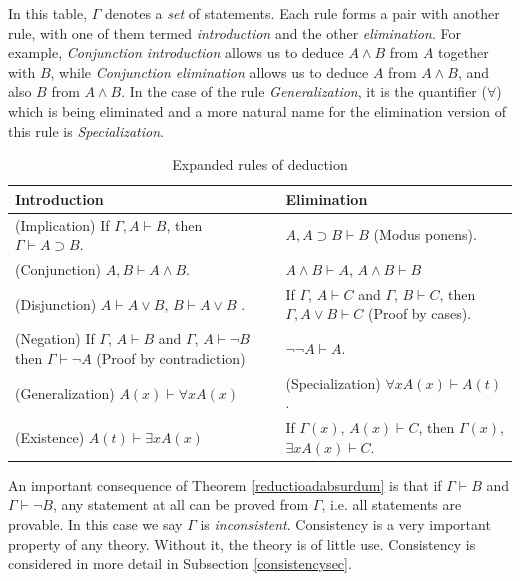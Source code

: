 In this table, $\Gamma$ denotes a {\em set} of statements. Each rule forms a pair with
another rule, with one of them termed {\em introduction} and the other {\em elimination}.
For example, {\em Conjunction introduction} allows us to deduce $A\wedge B$ from $A$ together with $B$,
while {\em Conjunction elimination} allows us to deduce $A$ from $A\wedge B$, and also $B$ from $A\wedge B$.
In the case of the rule {\em Generalization}, it is the quantifier ($\forall$) which is being eliminated
and a more natural name for the elimination version of this rule is {\em Specialization}.
\begin{table}
		\centering
		\caption{Expanded rules of deduction}\label{Kleenerules}
		\begin{tabular}{|p{5cm}|p{5cm}|}
				\hline
		\bf Introduction & \bf Elimination\\
				\hline
		(Implication) If $\Gamma, A \vdash B$, then $\Gamma \vdash A\supset B$. &
		$A, A\supset B \vdash B$ (Modus ponens).\\
				\hline
		(Conjunction) $A, B \vdash A \wedge B$. & $A\wedge B \vdash A$, $A\wedge B \vdash B$\\
				\hline
		(Disjunction) $A \vdash A \vee B $, $B \vdash A \vee B $ . & If $\Gamma$, $A\vdash C $ and $\Gamma$, $B \vdash C$,
				then $\Gamma, A\vee B \vdash C$ (Proof by cases).\\
				\hline
		(Negation) If $\Gamma$, $A \vdash B$ and $\Gamma$, $A \vdash \neg B $ 
				then $\Gamma \vdash \neg A$ (Proof by contradiction) & $\neg\neg A \vdash A$.\\
				\hline
		(Generalization) $A(x) \vdash \forall xA(x)$ & (Specialization) $\forall x A(x) \vdash A(t)$.\\
				\hline
		(Existence) $A(t) \vdash \exists x A(x)$ & If $\Gamma(x)$, $A(x) \vdash C$, then
				$\Gamma(x)$, $\exists x A(x) \vdash C$.\\
				\hline
\end{tabular}
\end{table}
%

An important consequence of Theorem \ref{reductioadabsurdum} is that if $\Gamma\vdash B$ and $\Gamma\vdash\neg B$,
any statement at all can be proved from $\Gamma$, i.e. all statements are provable. In this case we say $\Gamma$ 
is {\em inconsistent}. Consistency is a very important property of any theory. Without it, the theory is of
little use. Consistency is considered in more detail in Subsection \ref{consistencysec}.

